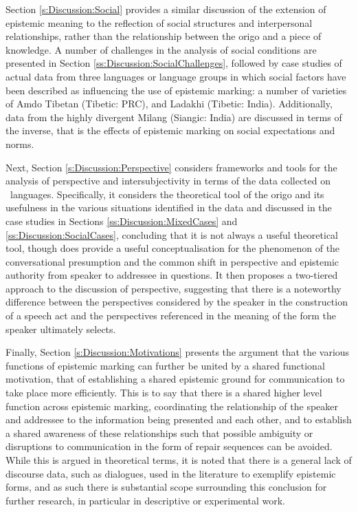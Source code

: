 Section \ref{s:Discussion:Social} provides a similar discussion of the extension of epistemic meaning to the reflection of social structures and interpersonal relationships, rather than the relationship between the origo and a piece of knowledge. A number of challenges in the analysis of social conditions are presented in Section \ref{ss:Discussion:SocialChallenges}, followed by case studies of actual data from three languages or language groups in which social factors have been described as influencing the use of epistemic marking: a number of varieties of Amdo Tibetan (Tibetic: PRC), and Ladakhi (Tibetic: India). Additionally, data from the highly divergent Milang (Siangic: India) are discussed in terms of the inverse, that is the effects of epistemic marking on social expectations and norms.

Next, Section \ref{s:Discussion:Perspective} considers frameworks and tools for the analysis of perspective and intersubjectivity in terms of the data collected on \lfam\ languages. Specifically, it considers the theoretical tool of the origo and its usefulness in the various situations identified in the data and discussed in the case studies in Sections \ref{ss:Discussion:MixedCases} and \ref{ss:Discussion:SocialCases}, concluding that it is not always a useful theoretical tool, though does provide a useful conceptualisation for the phenomenon of the conversational presumption and the common shift in perspective and epistemic authority from speaker to addressee in questions. It then proposes a two-tiered approach to the discussion of perspective, suggesting that there is a noteworthy difference between the perspectives considered by the speaker in the construction of a speech act and the perspectives referenced in the meaning of the form the speaker ultimately selects.

Finally, Section \ref{s:Discussion:Motivations} presents the argument that the various functions of epistemic marking can further be united by a shared functional motivation, that of establishing a shared epistemic ground for communication to take place more efficiently. This is to say that there is a shared higher level function across epistemic marking, coordinating the relationship of the speaker and addressee to the information being presented and each other, and to establish a shared awareness of these relationships such that possible ambiguity or disruptions to communication in the form of repair sequences can be avoided. While this is argued in theoretical terms, it is noted that there is a general lack of discourse data, such as dialogues, used in the literature to exemplify epistemic forms, and as such there is substantial scope surrounding this conclusion for further research, in particular in descriptive or experimental work.


